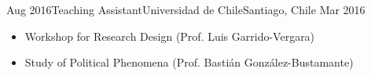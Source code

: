 \begin{experiences}
  \emptySeparator 
  \experience 
    {Aug 2016}{Teaching Assistant}{Universidad de Chile}{Santiago, Chile} {Mar 2016}
    {\begin{itemize}
    \item Workshop for Research Design {\small (Prof. Luis Garrido-Vergara)}
    \item Study of Political Phenomena {\small (Prof. Bastián González-Bustamante)}
    \end{itemize}}
    {}
\end{experiences}

